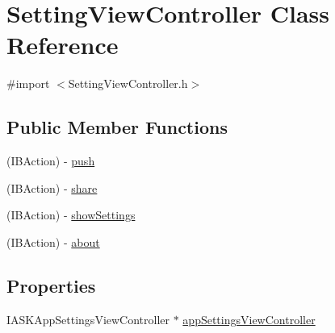 \hypertarget{interface_setting_view_controller}{
\section{\-Setting\-View\-Controller \-Class \-Reference}
\label{interface_setting_view_controller}
}


{\ttfamily \#import $<$\-Setting\-View\-Controller.\-h$>$}

\subsection*{\-Public \-Member \-Functions}
\begin{DoxyCompactItemize}
\item 
(\-I\-B\-Action) -\/ \hyperlink{interface_setting_view_controller_a056d918f21e4edafc0f8b24ad740c35c}{push}
\item 
(\-I\-B\-Action) -\/ \hyperlink{interface_setting_view_controller_af522c209475d11a035c90a7d83572d1b}{share}
\item 
(\-I\-B\-Action) -\/ \hyperlink{interface_setting_view_controller_a75c8b72e120c661ddad8d46479c1bb49}{show\-Settings}
\item 
(\-I\-B\-Action) -\/ \hyperlink{interface_setting_view_controller_a0d98e5dbede3ce71baf1747a9274e066}{about}
\end{DoxyCompactItemize}
\subsection*{\-Properties}
\begin{DoxyCompactItemize}
\item 
\-I\-A\-S\-K\-App\-Settings\-View\-Controller $\ast$ \hyperlink{interface_setting_view_controller_ab3dc108801289aadfd59ef525a43daa2}{app\-Settings\-View\-Controller}
\end{DoxyCompactItemize}


